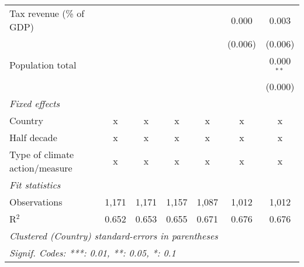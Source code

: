 \begin{tabular}{lcccccc}
   Tax revenue (\% of GDP)                                    &         &              &         &         & 0.000   & 0.003\\   
                                                              &         &              &         &         & (0.006) & (0.006)\\   
   Population total                                           &         &              &         &         &         & 0.000$^{**}$\\   
                                                              &         &              &         &         &         & (0.000)\\   
   \emph{Fixed effects}\\
   Country                                                    & x       & x            & x       & x       & x       & x\\  
   Half decade                                                & x       & x            & x       & x       & x       & x\\  
   Type of climate action/measure                             & x       & x            & x       & x       & x       & x\\  
   \midrule \emph{Fit statistics}\\
   Observations                                               & 1,171   & 1,171        & 1,157   & 1,087   & 1,012   & 1,012\\  
   R$^2$                                                      & 0.652   & 0.653        & 0.655   & 0.671   & 0.676   & 0.676\\  
   \midrule
   \multicolumn{7}{l}{\emph{Clustered (Country) standard-errors in parentheses}}\\
   \multicolumn{7}{l}{\emph{Signif. Codes: ***: 0.01, **: 0.05, *: 0.1}}\\
\end{tabular}
\par\endgroup


